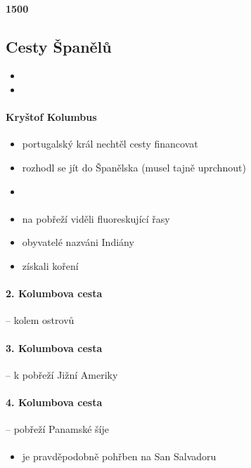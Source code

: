 \paragraph{1500}

\subsection{Cesty Španělů}
\begin{itemize}
\item {}
\item {}
\end{itemize}

\paragraph{Kryštof Kolumbus}
\begin{itemize}
\item portugalský král nechtěl cesty financovat
\item rozhodl se jít do Španělska (musel tajně uprchnout)
\item {}
\end{itemize}

\paragraph{}
\begin{itemize}
\item na pobřeží viděli fluoreskující řasy
\item obyvatelé nazváni Indiány
\item získali koření
\end{itemize}

\paragraph{2. Kolumbova cesta} -- kolem ostrovů
\paragraph{3. Kolumbova cesta} -- k pobřeží Jižní Ameriky
\paragraph{4. Kolumbova cesta} -- pobřeží Panamské šíje

\paragraph{}
\begin{itemize}
\item je pravděpodobně pohřben na San Salvadoru
\end{itemize}


